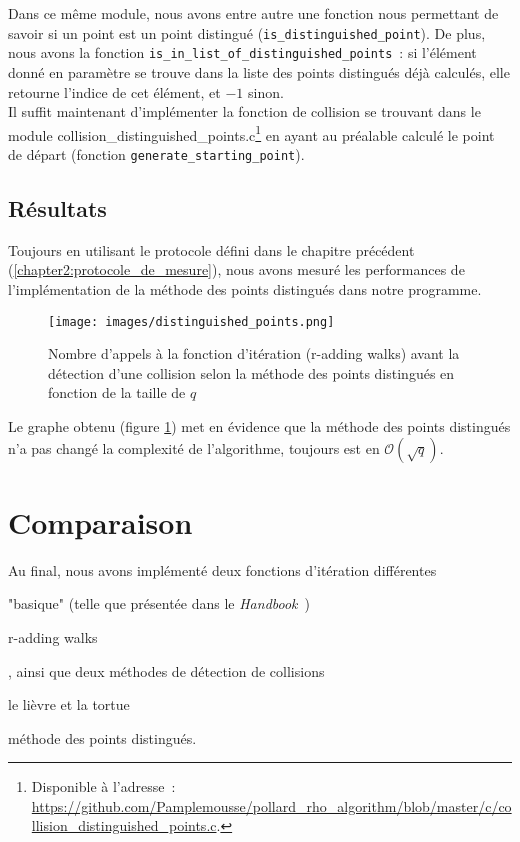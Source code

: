       Dans ce même module, nous avons entre autre une fonction nous permettant de savoir si un point est un point distingué (\lstinline{is_distinguished_point}).
      De plus, nous avons la fonction \lstinline{is_in_list_of_distinguished_points}~: si l'élément donné en paramètre se trouve dans la liste des points distingués déjà calculés, elle retourne l'indice de cet élément, et $-1$ sinon.\\

      Il suffit maintenant d'implémenter la fonction de collision se trouvant dans le module collision\_distinguished\_points.c\footnote{Disponible à l'adresse~: \url{https://github.com/Pamplemousse/pollard_rho_algorithm/blob/master/c/collision_distinguished_points.c}.} en ayant au préalable calculé le point de départ (fonction \lstinline{generate_starting_point}).

      \subsection{Résultats}
      Toujours en utilisant le protocole défini dans le chapitre précédent (\ref{chapter2:protocole_de_mesure}), nous avons mesuré les performances de l'implémentation de la méthode des points distingués dans notre programme.

      \begin{figure}
        \center{}
        \texttt{[image: images/distinguished\_points.png]}
        \caption{Nombre d'appels à la fonction d'itération (r-adding walks) avant la détection d'une collision selon la méthode des points distingués en fonction de la taille de $q$}
        \label{fig:r_adding_walks_and_distinguished_points_results}
      \end{figure}

      Le graphe obtenu (figure \ref{fig:r_adding_walks_and_distinguished_points_results}) met en évidence que la méthode des points distingués n'a pas changé la complexité de l'algorithme, toujours est en $\mathcal{O}(\sqrt{q})$.


    \section{Comparaison}
    Au final, nous avons implémenté deux fonctions d'itération différentes
    \begin{enumerate*}
      \item "basique" (telle que présentée dans le \textit{Handbook}~\autocite[107]{handbook})
      \item r-adding walks
    \end{enumerate*}
    , ainsi que deux méthodes de détection de collisions
    \begin{enumerate*}
      \item le lièvre et la tortue
      \item méthode des points distingués.
    \end{enumerate*}

